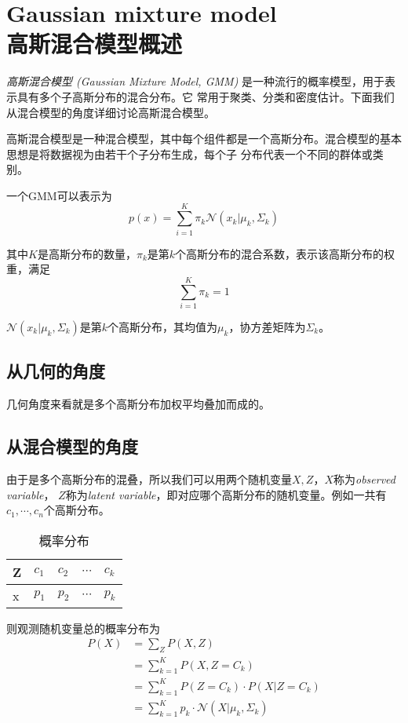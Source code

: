\chapter{Gaussian mixture model\\高斯混合模型概述}

\textsl{高斯混合模型 (Gaussian Mixture Model, GMM)} 是一种流行的概率模型，用于表示具有多个子高斯分布的混合分布。它
常用于聚类、分类和密度估计。下面我们从混合模型的角度详细讨论高斯混合模型。

高斯混合模型是一种混合模型，其中每个组件都是一个高斯分布。混合模型的基本思想是将数据视为由若干个子分布生成，每个子
分布代表一个不同的群体或类别。

一个GMM可以表示为
\begin{equation}
    p(x)=\sum\limits_{i=1}^{K}\pi_k\mathcal{N}(x_k|\mu_k,\varSigma_k)
\end{equation}

其中$K$是高斯分布的数量，$\pi_k$是第$k$个高斯分布的混合系数，表示该高斯分布的权重，满足
\begin{equation}
    \sum\limits_{i=1}^{K}\pi_k=1
\end{equation}

$\mathcal{N}(x_k|\mu_k,\varSigma_k)$是第$k$个高斯分布，其均值为$\mu_k$，协方差矩阵为$\varSigma_k$。

\section{从几何的角度}

几何角度来看就是多个高斯分布加权平均叠加而成的。

\section{从混合模型的角度}

由于是多个高斯分布的混叠，所以我们可以用两个随机变量$X,Z$，$X$称为\textsl{observed variable}，
$Z$称为\textsl{latent variable}，即对应哪个高斯分布的随机变量。例如一共有$c_1,\cdots,c_n$个高斯分布。

\begin{table}[htb]
    \centering
    \label{tab:taskdivision}
    \begin{tabularx}{\textwidth}{l|XXXX}
         Z & $c_1$ & $c_2$ & $\cdots$ & $c_k$\\
        \midrule
        x & $p_1$ & $p_2$ & $\cdots$ & $p_k$
    \end{tabularx}
    \caption{概率分布}
\end{table}

则观测随机变量总的概率分布为
\begin{equation}
    \begin{aligned}
         P(X) & = \sum\limits_{Z}P(X,Z)\\
              & = \sum\limits_{k=1}^{K}P(X,Z=C_k)\\
              & = \sum\limits_{k=1}^{K}P(Z=C_k)\cdot P(X|Z=C_k)\\
              & = \sum\limits_{k=1}^{K}p_k\cdot \mathcal{N}(X|\mu_k,\varSigma_k )\\
    \end{aligned}
\end{equation}
